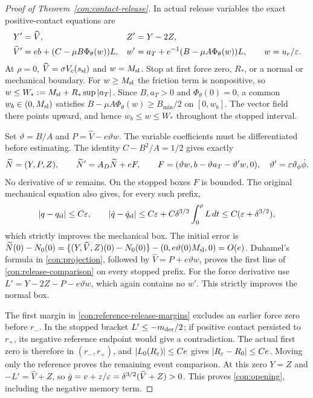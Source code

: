 \begin{proof}[Proof of Theorem~\ref{con:contact-release}]
In actual release variables the exact positive-contact equations are
\begin{equation}
 \begin{aligned}
 Y'&=\widehat V,& Z'&=Y-2Z,\\
 \widehat V'&=eb+(C-\mu B\Phi_\theta(w))L,&
 w'&=a_T+e^{-1}(B-\mu A\Phi_\theta(w))L,
 \qquad w=u_r/\varepsilon.
 \end{aligned}
 \label{con:actual-release}
\end{equation}
At $\rho=0$, $\widehat V=\sigma V_c(s_{\rm sl})$ and $w=M_{\rm sl}$.
Stop at first force zero, $R_*$, or a normal or mechanical boundary.
For $w\ge M_{\rm sl}$ the friction term is nonpositive, so
$w\le W_*:=M_{\rm sl}+R_*\sup|a_T|$.  Since $B,a_T>0$ and
$\Phi_\theta(0)=0$, a common $w_b\in(0,M_{\rm sl})$ satisfies
$B-\mu A\Phi_\theta(w)\ge B_{\min}/2$ on $[0,w_b]$.
The vector field there points upward, and hence $w_b\le w\le W_*$
throughout the stopped interval.

Set $\vartheta=B/A$ and $P=\widehat V-e\vartheta w$.
The variable coefficients must be differentiated before estimating.
The identity $C-B^2/A=1/2$ gives exactly
\begin{equation}
 \widetilde N=(Y,P,Z),\qquad
 \widetilde N'=A_D\widetilde N+eF,\qquad
 F=(\vartheta w,b-\vartheta a_T-\vartheta'w,0),
 \quad \vartheta'=\varepsilon\vartheta_\phi\dot\phi.
 \label{con:projection}
\end{equation}
No derivative of $w$ remains.  On the stopped boxes $F$ is bounded.
The original mechanical equation also gives, for every such prefix,
\begin{equation}
 |q-q_{\rm sl}|\le C\varepsilon,\qquad
 |\dot q-\dot q_{\rm sl}|\le C\varepsilon+
 C\delta^{3/2}\int_0^\rho L\,dt
 \le C(\varepsilon+\delta^{3/2}),
 \label{con:release-mechanics}
\end{equation}
which strictly improves the mechanical box.
The initial error is
$\widetilde N(0)-N_0(0)=
\{(Y,\widehat V,Z)(0)-N_0(0)\}-(0,e\vartheta(0)M_{\rm sl},0)=O(e)$.
Duhamel's formula in \eqref{con:projection}, followed by
$\widehat V=P+e\vartheta w$, proves the first line of
\eqref{con:release-comparison} on every stopped prefix.  For the force
derivative use $L'=Y-2Z-P-e\vartheta w$, which again contains no $w'$.
This strictly improves the normal box.

The first margin in \eqref{con:reference-release-margins} excludes
an earlier force zero before $r_-$.  In the stopped bracket
$L'\le-m_{\rm der}/2$; if positive contact persisted to $r_+$, its
negative reference endpoint would give a contradiction.  The actual
first zero is therefore in $(r_-,r_+)$, and
$|L_0(R_\varepsilon)|\le Ce$ gives $|R_\varepsilon-R_0|\le Ce$.
Moving only the reference proves the remaining event comparison.
At this zero $Y=Z$ and
$-L'=\widehat V+Z$, so
$\dot g=v+z/\varepsilon=\delta^{3/2}(\widehat V+Z)>0$.
This proves \eqref{con:opening}, including the negative memory term.


\end{proof}
